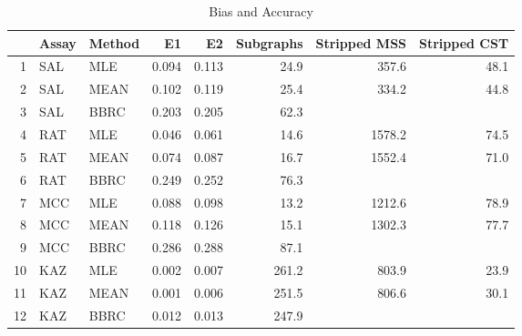 \begin{table}[t]
\begin{center}
\begin{tabular}{rllrrrrr}
  \hline
 & Assay & Method & E1 & E2 & Subgraphs & Stripped MSS & Stripped CST \\ 
  \hline
1 & SAL & MLE & 0.094 & 0.113 & 24.9 & 357.6 & 48.1 \\ 
  2 & SAL & MEAN & 0.102 & 0.119 & 25.4 & 334.2 & 44.8 \\ 
  3 & SAL & BBRC & 0.203 & 0.205 & 62.3 &  &  \\ 
  4 & RAT & MLE & 0.046 & 0.061 & 14.6 & 1578.2 & 74.5 \\ 
  5 & RAT & MEAN & 0.074 & 0.087 & 16.7 & 1552.4 & 71.0 \\ 
  6 & RAT & BBRC & 0.249 & 0.252 & 76.3 &  &  \\ 
  7 & MCC & MLE & 0.088 & 0.098 & 13.2 & 1212.6 & 78.9 \\ 
  8 & MCC & MEAN & 0.118 & 0.126 & 15.1 & 1302.3 & 77.7 \\ 
  9 & MCC & BBRC & 0.286 & 0.288 & 87.1 &  &  \\ 
  10 & KAZ & MLE & 0.002 & 0.007 & 261.2 & 803.9 & 23.9 \\ 
  11 & KAZ & MEAN & 0.001 & 0.006 & 251.5 & 806.6 & 30.1 \\ 
  12 & KAZ & BBRC & 0.012 & 0.013 & 247.9 &  &  \\ 
   \hline
\end{tabular}
\caption{Bias and Accuracy}
\label{t:anal}
\end{center}
\end{table}
